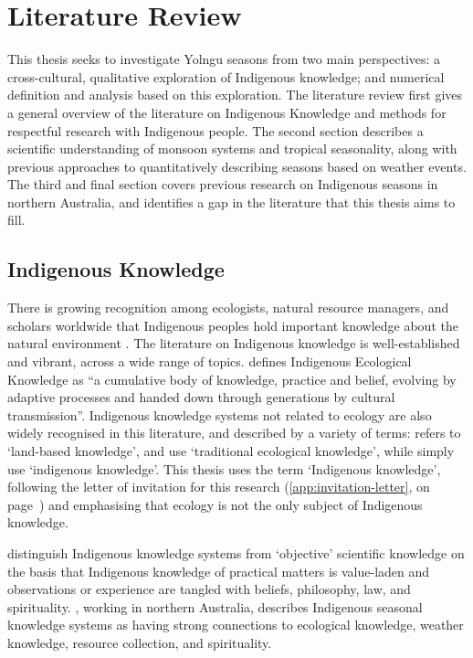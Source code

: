 \chapter{Literature Review}
\label{ch:lit-review}

This thesis seeks to investigate Yolngu seasons from two main perspectives:
a cross-cultural, qualitative exploration of Indigenous knowledge; and
numerical definition and analysis based on this exploration.
%
The literature review first gives a general
overview of the literature on Indigenous Knowledge and methods for respectful
research with Indigenous people.  The second section describes a scientific
understanding of monsoon systems and tropical seasonality, along with previous
approaches to quantitatively describing seasons based on weather events.
The third and final section covers previous research on Indigenous seasons in northern
Australia, and identifies a gap in the literature that this thesis aims to fill.


\section{Indigenous Knowledge}
\label{sec:lit-iek}

There is growing recognition among ecologists, natural resource managers, and
scholars worldwide that Indigenous peoples hold important knowledge about the
natural environment \citep[see eg.][and many others]{clarke2009,prober2011,ens2014}.
The literature on Indigenous knowledge
is well-established and vibrant, across a wide range of topics.
\citet{berkes2012} defines Indigenous Ecological Knowledge as ``a cumulative
body of knowledge, practice and belief, evolving by adaptive processes and
handed down through generations by cultural transmission''.
%
Indigenous knowledge systems not related to ecology are also widely recognised in this literature,
and described by a variety of terms:  \citet{clarke2009} refers to `land-based
knowledge', \citet{petheram2010} and \citet{turner2009} use `traditional
ecological knowledge', while \citet{cochran2015} simply use `indigenous
knowledge'.  This thesis uses the term `Indigenous knowledge', following the
letter of invitation for this research (\cref{app:invitation-letter}, on page~\pageref{app:invitation-letter}) and
emphasising that ecology is not the only subject of Indigenous knowledge.


\citet{turner2009} distinguish Indigenous knowledge systems from `objective'
scientific knowledge on the basis that Indigenous knowledge of practical
matters is value-laden and observations or experience are tangled with beliefs,
philosophy, law, and spirituality.  \citet{woodward2012b}, working in northern
Australia, describes Indigenous seasonal knowledge systems as having strong connections
to ecological knowledge, weather knowledge, resource collection, and spirituality.

